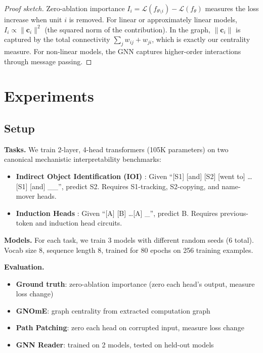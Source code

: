 \documentclass[11pt]{article}
\begin{document}
\begin{proof}[Proof sketch]
Zero-ablation importance $I_i = \mathcal{L}(f_{\theta \setminus i}) - \mathcal{L}(f_\theta)$ measures the loss increase when unit $i$ is removed. For linear or approximately linear models, $I_i \propto \|\mathbf{c}_i\|^2$ (the squared norm of the contribution). In the graph, $\|\mathbf{c}_i\|$ is captured by the total connectivity $\sum_j w_{ij} + w_{ji}$, which is exactly our centrality measure. For non-linear models, the GNN captures higher-order interactions through message passing.
\end{proof}

\section{Experiments}

\subsection{Setup}

\textbf{Tasks.} We train 2-layer, 4-head transformers (105K parameters) on two canonical mechanistic interpretability benchmarks:
\begin{itemize}
    \item \textbf{Indirect Object Identification (IOI)} \citep{wang2023interpretability}: Given ``[S1] [and] [S2] [went to] \ldots [S1] [and] \_\_'', predict S2. Requires S1-tracking, S2-copying, and name-mover heads.
    \item \textbf{Induction Heads} \citep{olsson2022incontext}: Given ``[A] [B] \ldots [A] \_'', predict B. Requires previous-token and induction head circuits.
\end{itemize}

\textbf{Models.} For each task, we train 3 models with different random seeds (6 total). Vocab size 8, sequence length 8, trained for 80 epochs on 256 training examples.

\textbf{Evaluation.}
\begin{itemize}
    \item \textbf{Ground truth}: zero-ablation importance (zero each head's output, measure loss change)
    \item \textbf{GNOmE}: graph centrality from extracted computation graph
    \item \textbf{Path Patching}: zero each head on corrupted input, measure loss change
    \item \textbf{GNN Reader}: trained on 2 models, tested on held-out models
\end{itemize}
\end{document}
